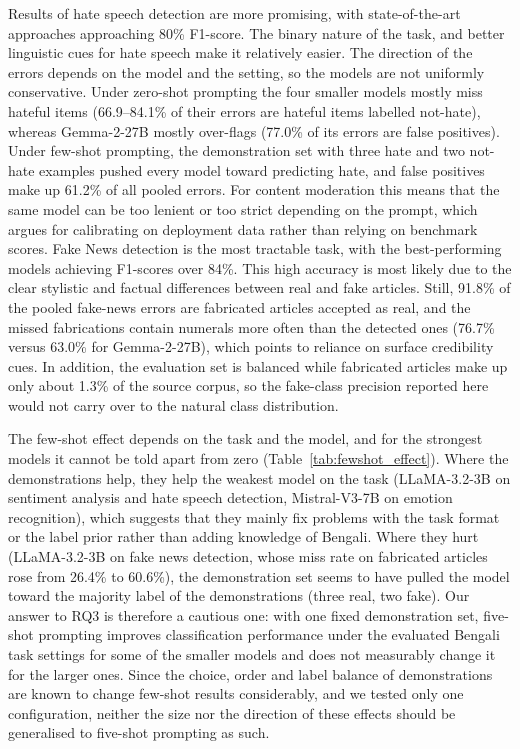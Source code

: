 \documentclass[10pt,letterpaper]{article}
\begin{document}
Results of hate speech detection are more promising, with state-of-the-art approaches approaching 80\% F1-score. The binary nature of the task, and better linguistic cues for hate speech make it relatively easier. The direction of the errors depends on the model and the setting, so the models are not uniformly conservative. Under zero-shot prompting the four smaller models mostly miss hateful items (66.9--84.1\% of their errors are hateful items labelled not-hate), whereas Gemma-2-27B mostly over-flags (77.0\% of its errors are false positives). Under few-shot prompting, the demonstration set with three hate and two not-hate examples pushed every model toward predicting hate, and false positives make up 61.2\% of all pooled errors. For content moderation this means that the same model can be too lenient or too strict depending on the prompt, which argues for calibrating on deployment data rather than relying on benchmark scores. Fake News detection is the most tractable task, with the best-performing models achieving F1-scores over 84\%. This high accuracy is most likely due to the clear stylistic and factual differences between real and fake articles. Still, 91.8\% of the pooled fake-news errors are fabricated articles accepted as real, and the missed fabrications contain numerals more often than the detected ones (76.7\% versus 63.0\% for Gemma-2-27B), which points to reliance on surface credibility cues. In addition, the evaluation set is balanced while fabricated articles make up only about 1.3\% of the source corpus, so the fake-class precision reported here would not carry over to the natural class distribution.

The few-shot effect depends on the task and the model, and for the strongest models it cannot be told apart from zero (Table~\ref{tab:fewshot_effect}). Where the demonstrations help, they help the weakest model on the task (LLaMA-3.2-3B on sentiment analysis and hate speech detection, Mistral-V3-7B on emotion recognition), which suggests that they mainly fix problems with the task format or the label prior rather than adding knowledge of Bengali. Where they hurt (LLaMA-3.2-3B on fake news detection, whose miss rate on fabricated articles rose from 26.4\% to 60.6\%), the demonstration set seems to have pulled the model toward the majority label of the demonstrations (three real, two fake). Our answer to RQ3 is therefore a cautious one: with one fixed demonstration set, five-shot prompting improves classification performance under the evaluated Bengali task settings for some of the smaller models and does not measurably change it for the larger ones. Since the choice, order and label balance of demonstrations are known to change few-shot results considerably, and we tested only one configuration, neither the size nor the direction of these effects should be generalised to five-shot prompting as such.
\end{document}
